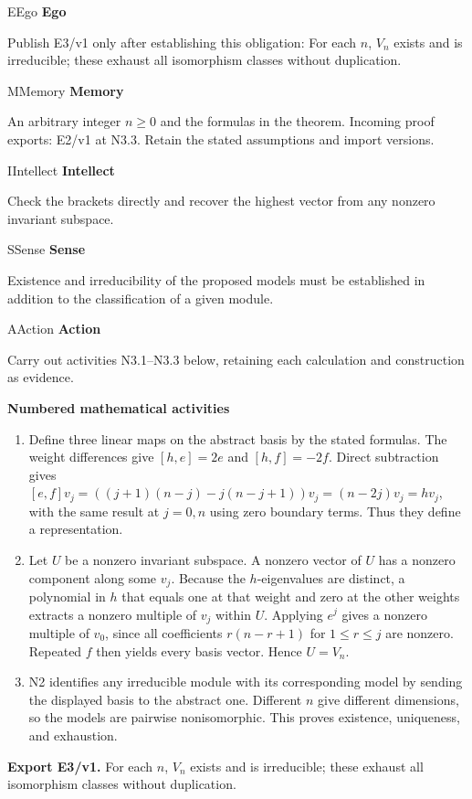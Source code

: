 \documentclass[preprint,12pt,aps,pra,showkeys,amsmath,amssymb,superscriptaddress,floatfix]{revtex4-2}
\theoremstyle{definition}
\theoremstyle{remark}
\newcommand{\mmfaculty}[3]{%
 \begin{mmfacultybox}{#1}{#2}
 {\sffamily\bfseries\color{MMBlue}#2}\par\smallskip #3
 \end{mmfacultybox}}
\newcommand{\field}[2]{\par\smallskip\noindent\textbf{#1.} #2\par}
\begin{document}
\mmfaculty{E}{Ego}{Publish E3/v1 only after establishing this obligation: For each \(n\),
\(V_n\) exists and is irreducible; these exhaust all isomorphism classes
without duplication.}

\mmfaculty{M}{Memory}{An arbitrary integer \(n\ge0\) and the formulas in the theorem. Incoming
proof exports: E2/v1 at N3.3. Retain the stated assumptions and import
versions.}

\mmfaculty{I}{Intellect}{Check the brackets directly and recover the highest vector from any
nonzero invariant subspace.}

\mmfaculty{S}{Sense}{Existence and irreducibility of the proposed models must be established
in addition to the classification of a given module.}

\mmfaculty{A}{Action}{Carry out activities N3.1--N3.3 below, retaining each calculation and
construction as evidence.}

\smallskip\noindent\textbf{Numbered mathematical activities}

\begin{enumerate}[label=N3.\arabic*,leftmargin=3.4em]

\item Define three linear maps on the abstract basis by the stated formulas.
The weight differences give \([h,e]=2e\) and \([h,f]=-2f\). Direct
subtraction gives \([e,f]v_j=((j+1)(n-j)-j(n-j+1))v_j=(n-2j)v_j=hv_j\),
with the same result at \(j=0,n\) using zero boundary terms. Thus they
define a representation.

\item Let \(U\) be a nonzero invariant subspace. A nonzero vector of \(U\) has
a nonzero component along some \(v_j\). Because the \(h\)-eigenvalues
are distinct, a polynomial in \(h\) that equals one at that weight and
zero at the other weights extracts a nonzero multiple of \(v_j\) within
\(U\). Applying \(e^j\) gives a nonzero multiple of \(v_0\), since all
coefficients \(r(n-r+1)\) for \(1\le r\le j\) are nonzero. Repeated
\(f\) then yields every basis vector. Hence \(U=V_n\).

\item N2 identifies any irreducible module with its corresponding model by
sending the displayed basis to the abstract one. Different \(n\) give
different dimensions, so the models are pairwise nonisomorphic. This
proves existence, uniqueness, and exhaustion.

\end{enumerate}

\field{Export E3/v1}{For each \(n\), \(V_n\) exists and is irreducible; these exhaust all
isomorphism classes without duplication.}
\end{document}
